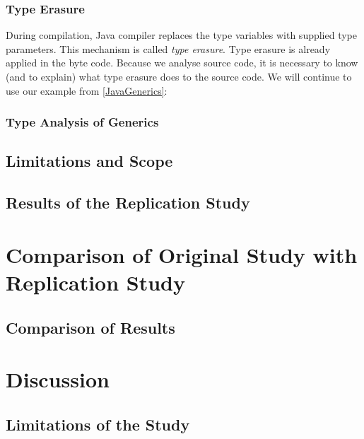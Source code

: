 \documentclass{uvamscse}
\begin{document}
\subsection{Type Erasure}
During compilation, Java compiler replaces the type variables with supplied type parameters. This mechanism is called \emph{type erasure}. Type erasure is already applied in the byte code. Because we analyse source code, it is necessary to know (and to explain) what type erasure does to the source code. We will continue to use our example from \ref{JavaGenerics}: 





\subsection{Type Analysis of Generics}






\section{Limitations and Scope}



\section{Results of the Replication Study}







\chapter{Comparison of Original Study with Replication Study}

\section{Comparison of Results}




\chapter{Discussion}

\section{Limitations of the Study}
\end{document}
